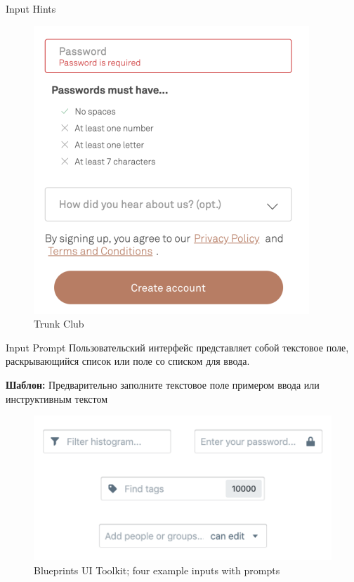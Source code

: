 \documentclass{beamer}
\begin{document}
\begin{frame}[t]{Input Hints}
	\begin{figure}[h]
		\centering
		\includegraphics[scale=0.5]{images/lec08-pic45.png}
		\caption{Trunk Club}
	\end{figure}
\end{frame}

\begin{frame}[t]{Input Prompt}
	Пользовательский интерфейс представляет собой текстовое поле, раскрывающийся список или поле со списком для ввода.
	
	\textbf{Шаблон:} Предварительно заполните текстовое поле примером ввода или инструктивным текстом
	\begin{figure}[h]
		\centering
		\includegraphics[scale=0.5]{images/lec08-pic46.png}
		\caption{Blueprints UI Toolkit; four example inputs with prompts}
	\end{figure}
\end{frame}
\end{document}
